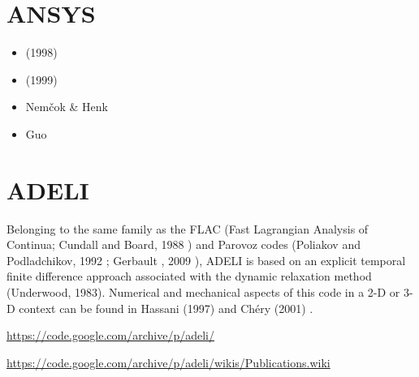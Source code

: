 \section{ANSYS} 

\begin{small}
\begin{itemize}
\item \textcite{mafs98} (1998)
\item \textcite{mafs99} (1999)
\item Nem{\v{c}}ok \& Henk \cite{nehe06}
\item Guo \etal \cite{guyr16}
\end{itemize}
\end{small}

\section{ADELI} 

Belonging to the same family as the FLAC 
(Fast Lagrangian Analysis of Continua; Cundall and Board, 1988 \cite{cubo88}) 
and Parovoz codes 
(Poliakov and Podladchikov, 1992 \cite{popo92}; Gerbault \etal, 2009 \cite{gecm09}), 
ADELI is based on an explicit temporal
finite difference approach associated with the dynamic relaxation method (Underwood, 1983). 
Numerical and mechanical aspects of this code in a 2-D or 3-D context can be 
found in Hassani \etal (1997) \cite{hajc97} and Ch\'ery \etal (2001) \cite{chzh01}.

\url{https://code.google.com/archive/p/adeli/}

\url{https://code.google.com/archive/p/adeli/wikis/Publications.wiki}

